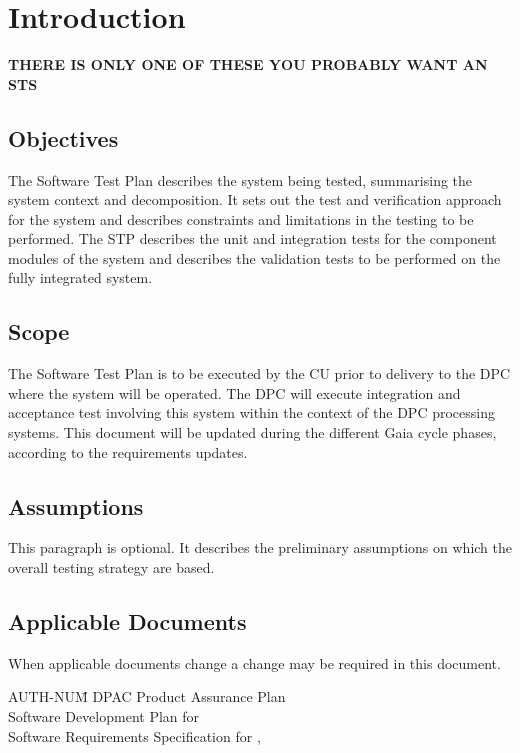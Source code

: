 
\section{Introduction \label{sect:intro}}

{\bf THERE IS ONLY ONE OF THESE YOU PROBABLY WANT AN STS}


\subsection{Objectives \label{sect:objectives}}

The Software Test Plan describes the system being tested, summarising the system context and decomposition. It sets out the test and verification approach for the system and describes constraints and limitations in the testing to be performed. The STP describes the unit and integration tests for the component modules of the system and describes the validation tests to be performed on the fully integrated system. 

\subsection{Scope \label{sect:scope}}

The Software Test Plan is to be executed by the CU prior to delivery to the DPC where the system will be operated. The DPC will execute integration and acceptance test involving this system within the context of the DPC processing systems.
This document will be updated during the different Gaia cycle phases, according to the requirements updates.

\subsection{Assumptions}  
This paragraph is optional. It describes the preliminary assumptions on which the overall testing strategy are based.
 
\subsection{Applicable Documents \label{sect:ad}}
When applicable documents change a change may be required in this document.
\begin{tabbing}
AUTH-NUM\= \kill 
{}\>	DPAC Product Assurance Plan \\
 \>	Software Development Plan for \CU \\
\>	Software Requirements Specification for \product,\\
\end{tabbing}

